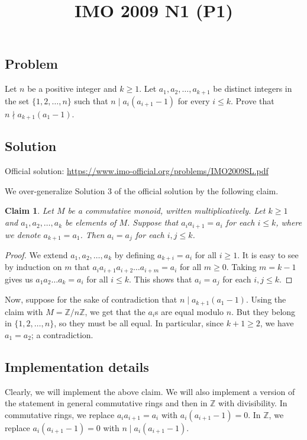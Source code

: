\documentclass{article}
\title{IMO 2009 N1 (P1)}
\author{}
\date{}
\newcommand{\Z}{\mathbb{Z}}
\newtheorem*{claim}{Claim}
\begin{document}
\maketitle



\subsection*{Problem}

Let $n$ be a positive integer and $k \geq 1$.
Let $a_1, a_2, \ldots, a_{k + 1}$ be distinct integers in the set $\{1, 2, \ldots, n\}$ such that $n \mid a_i (a_{i + 1} - 1)$ for every $i \leq k$.
Prove that $n \nmid a_{k + 1} (a_1 - 1)$.



\subsection*{Solution}

Official solution: \url{https://www.imo-official.org/problems/IMO2009SL.pdf}

We over-generalize Solution 3 of the official solution by the following claim.

\begin{claim}
Let $M$ be a commutative monoid, written multiplicatively.
Let $k \geq 1$ and $a_1, a_2, \ldots, a_k$ be elements of $M$.
Suppose that $a_i a_{i + 1} = a_i$ for each $i \leq k$, where we denote $a_{k + 1} = a_1$.
Then $a_i = a_j$ for each $i, j \leq k$.
\end{claim}
\begin{proof}
We extend $a_1, a_2, \ldots, a_k$ by defining $a_{k + i} = a_i$ for all $i \geq 1$.
It is easy to see by induction on $m$ that $a_i a_{i + 1} a_{i + 2} \ldots a_{i + m} = a_i$ for all $m \geq 0$.
Taking $m = k - 1$ gives us $a_1 a_2 \ldots a_k = a_i$ for all $i \leq k$.
This shows that $a_i = a_j$ for each $i, j \leq k$.
\end{proof}

Now, suppose for the sake of contradiction that $n \mid a_{k + 1} (a_1 - 1)$.
Using the claim with $M = \Z/n\Z$, we get that the $a_i$s are equal modulo $n$.
But they belong in $\{1, 2, \ldots, n\}$, so they must be all equal.
In particular, since $k + 1 \geq 2$, we have $a_1 = a_2$; a contradiction.



\subsection*{Implementation details}

Clearly, we will implement the above claim.
We will also implement a version of the statement in general commutative rings and then in $\Z$ with divisibility.
In commutative rings, we replace $a_i a_{i + 1} = a_i$ with $a_i (a_{i + 1} - 1) = 0$.
In $\Z$, we replace $a_i (a_{i + 1} - 1) = 0$ with $n \mid a_i (a_{i + 1} - 1)$.
\end{document}
